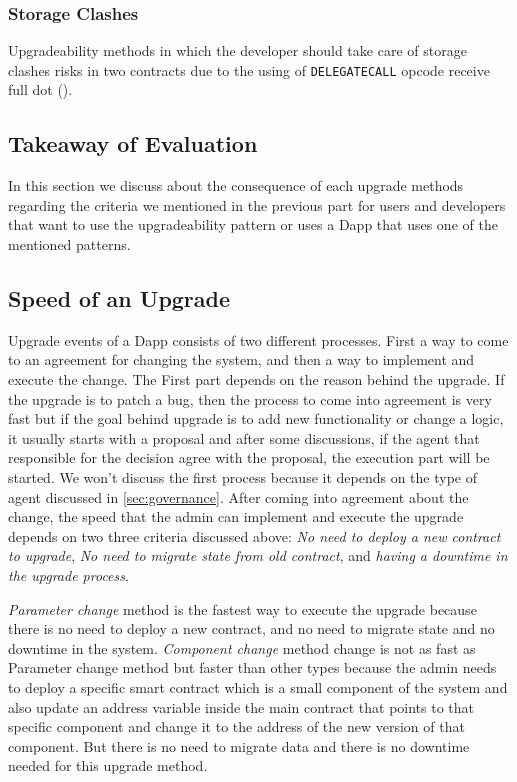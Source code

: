 \subsubsection{Storage Clashes}
Upgradeability methods in which the developer should take care of storage clashes risks in two contracts due to the using of \texttt{DELEGATECALL} opcode receive full dot (\full). 



\subsection{Takeaway of Evaluation}
In this section we discuss about the consequence of each upgrade methods regarding the criteria we mentioned in the previous part for users and developers that want to use the upgradeability pattern or uses a Dapp that uses one of the mentioned patterns.

\subsection{Speed of an Upgrade}
Upgrade events of a Dapp consists of two different processes. First a way to come to an agreement for changing the system, and then a way to implement and execute the change. The First part depends on the reason behind the upgrade. If the upgrade is to patch a bug, then the process to come into agreement is very fast but if the goal behind upgrade is to add new functionality or change a logic, it usually starts with a proposal and after some discussions, if the agent that responsible for the decision agree with the proposal, the execution part will be started. We won't discuss the first process because it depends on the type of agent discussed in \ref{sec:governance}.
After coming into agreement about the change, the speed that the admin can implement and execute the upgrade depends on two three criteria discussed above: \textit{No need to deploy a new contract to upgrade}, \textit{No need to migrate state from old contract}, and \textit{having a downtime in the upgrade process}.
 
\textit{Parameter change} method is the fastest way to execute the upgrade because there is no need to deploy a new contract, and no need to migrate state and no downtime in the system.
\textit{Component change} method change is not as fast as Parameter change method but faster than other types because the admin needs to deploy a specific smart contract which is a small component of the system and also update an address variable inside the main contract that points to that specific component and change it to the address of the new version of that component. But there is no need to migrate data and there is no downtime needed for this upgrade method.

